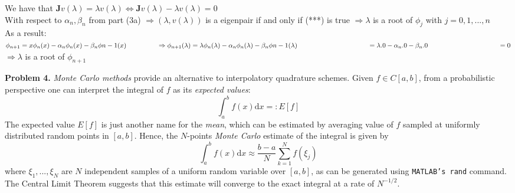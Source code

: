 \documentclass[14pt,a4paper]{article}
\begin{document}
\begin{enumerate}
	We have that $\textbf{J}v(\lambda) = \lambda v(\lambda) \Leftrightarrow \textbf{J}v(\lambda) - \lambda v(\lambda) = 0$	\\
	With respect to $\alpha_n, \beta_n$ from part (3a) $\Rightarrow (\lambda, v(\lambda))$ is a eigenpair if and only if  (***) is true $\Rightarrow \lambda$ is a root of $\phi_j$ with $ j = 0,1, ... , n$\\
	As a result: $ \phi_{n+1} = x\phi_n(x) - \alpha_n\phi_n(x) - \beta_n\phi{n-1}(x) \\
	\hspace*{1.6cm} \Rightarrow \phi_{n+1}(\lambda) = \lambda\phi_n(\lambda) - \alpha_n\phi_n(\lambda) - \beta_n\phi{n-1}(\lambda) \\
	\hspace*{3.7cm} = \lambda.0 - \alpha_n.0 - \beta_n.0 \\ \hspace*{3.7cm} = 0 $\\
	$\Rightarrow \lambda$ is a root of $\phi_{n+1}$
\end{enumerate}

\label{Problem 4}
\large\textbf{Problem 4.} \textit{Monte Carlo methods} provide an alternative to interpolatory quadrature schemes. Given $f \in C[a,b]$, from a probabilistic perspective one can interpret the integral of $f$ as its \textit{expected values}:
$$ \int_{a}^{b} f(x)\mathrm{d}x =: E[f]$$
The expected value $E[f]$ is just another name for the \textit{mean}, which can be estimated by averaging value of $f$ sampled at uniformly distributed random points in $[a,b]$. Hence, the $N$-points \textit{Monte Carlo} estimate of the integral is given by
$$ \int_{a}^{b} f(x)\mathrm{d}x \approx \dfrac{b-a}{N} \sum_{k=1}^{N}f(\xi_j)$$
where $\xi_1, ..., \xi_N$ are $N$ independent samples of a uniform random variable over $[a,b]$, as can be generated using \texttt{MATLAB's rand} command. The Central Limit Theorem suggests that this estimate will converge to the exact integral at a rate of $N^{-1/2}$.
\end{document}
